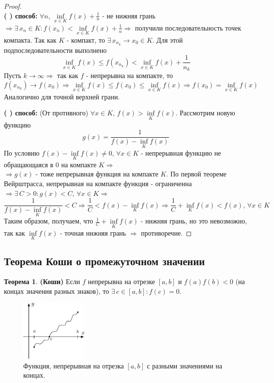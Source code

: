 \documentclass[12pt]{article}
\newcommand{\RN}[1]{%
	\textup{\uppercase\expandafter{\romannumeral#1}}%
}
\theoremstyle{definition}
\newtheorem{theorem}{Теорема}
\begin{document}
\begin{proof}\hfill\\
	\textbf{(\RN{1}) способ:} $\forall n, \, \inf\limits_{x \in K} f(x) + \frac{1}{n}$ - не нижняя грань $\Rightarrow \exists \, x_n \in K \colon f(x_n) < \inf\limits_{x \in K} f(x) + \frac{1}{n} \Rightarrow$ получили последовательность точек компакта. Так как $K$ - компакт, то $\exists \, x_{n_k} \to x_0 \in K$. Для этой подпоследовательности выполнено 
	$$ \inf\limits_{x \in K}  f(x) \leq f(x_{n_k}) < \inf\limits_{x \in K} f(x) + \frac{1}{n_k}$$ 
	Пусть $k \to \infty \Rightarrow$ так как $f$ - непрерывна на компакте, то 
	$$f(x_{n_k}) \to f(x_0) \Rightarrow \inf\limits_{x \in K}  f(x) \leq f(x_0) \leq \inf\limits_{x \in K} f(x) \Rightarrow f(x_0) = \inf\limits_{x \in K} f(x) $$
	Аналогично для точной верхней грани.
	
	\textbf{(\RN{2}) способ:} (От противного) $\forall x \in K, \, f(x) > \inf\limits_{K}f(x)$. Рассмотрим новую функцию 
	$$g(x) = \dfrac{1}{f(x) - \inf\limits_{K} f(x)}$$
	По условию $f(x) - \inf\limits_{K}f(x) \neq 0, \, \forall x \in K$ - непрерывная функцию не обращающаяся в 0 на компакте $K \Rightarrow$ \\
	$\Rightarrow g(x)$ - тоже непрерывная функция на компакте $K$. По первой теореме Вейрштрасса, непрерывная на компакте функция - ограниченна $\Rightarrow \exists \, C>0 \colon g(x) < C, \, \forall x \in K \Rightarrow$
	$$\dfrac{1}{f(x) - \inf\limits_{K} f(x)} < C \Rightarrow \frac{1}{C} <  f(x) - \inf\limits_{K} f(x) \Rightarrow  \frac{1}{C} + \inf\limits_{K}{f(x)} <  f(x), \, \forall x \in K$$  
	Таким образом, получаем, что $\frac{1}{C} + \inf\limits_{K}{f(x)}$ - нижняя грань, но это невозможно, так как $\inf\limits_{K}{f(x)}$ - точная нижняя грань $\Rightarrow$ противоречие.
\end{proof}

\subsection*{Теорема Коши о промежуточном значении}
	
\begin{theorem}\textbf{(Коши)}
	Если $f$ непрерывна на отрезке $[a,b]$ и $f(a)f(b) < 0$ (на концах значения разных знаков), то $\exists \, c \in [a,b] \colon f(c) = 0$.
\end{theorem}

\begin{figure}[H]
	\centering
	\includegraphics[width=0.3\textwidth]{18_5.eps}
	\caption{Функция, непрерывная на отрезка $[a,b]$ с разными значениями на концах.}
	\label{18_5}
\end{figure}
\end{document}
